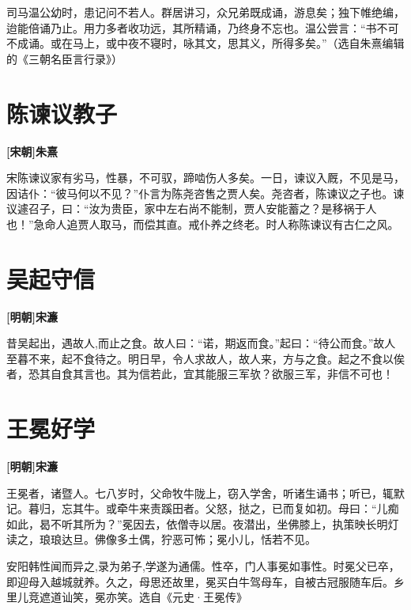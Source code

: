 \documentclass[UTF8,titlepage,oneside]{ctexbook}
\begin{document}
司马温公幼时，患记问不若人。群居讲习，众兄弟既成诵，游息矣；独下帷绝编，迨能倍诵乃止。用力多者收功远，其所精诵，乃终身不忘也。温公尝言：“书不可不成诵。或在马上，或中夜不寝时，咏其文，思其义，所得多矣。”（选自朱熹编辑的《三朝名臣言行录》）

\chapter*{陈谏议教子}
\begin{center}
	\textbf{[宋朝]朱熹}
\end{center}


宋陈谏议家有劣马，性暴，不可驭，蹄啮伤人多矣。一日，谏议入厩，不见是马，因诘仆：“彼马何以不见？”仆言为陈尧咨售之贾人矣。尧咨者，陈谏议之子也。谏议遽召子，曰：“汝为贵臣，家中左右尚不能制，贾人安能蓄之？是移祸于人也！”急命人追贾人取马，而偿其直。戒仆养之终老。时人称陈谏议有古仁之风。

\chapter*{吴起守信}
\begin{center}
	\textbf{[明朝]宋濂}
\end{center}


昔吴起出，遇故人,而止之食。故人曰：“诺，期返而食。”起曰：“待公而食。”故人至暮不来，起不食待之。明日早，令人求故人，故人来，方与之食。起之不食以俟者，恐其自食其言也。其为信若此，宜其能服三军欤？欲服三军，非信不可也！

\chapter*{王冕好学}
\begin{center}
	\textbf{[明朝]宋濂}
\end{center}


王冕者，诸暨人。七八岁时，父命牧牛陇上，窃入学舍，听诸生诵书；听已，辄默记。暮归，忘其牛。或牵牛来责蹊田者。父怒，挞之，已而复如初。母曰：“儿痴如此，曷不听其所为？”冕因去，依僧寺以居。夜潜出，坐佛膝上，执策映长明灯读之，琅琅达旦。佛像多土偶，狞恶可怖；冕小儿，恬若不见。


安阳韩性闻而异之,录为弟子,学遂为通儒。性卒，门人事冕如事性。时冕父已卒，即迎母入越城就养。久之，母思还故里，冕买白牛驾母车，自被古冠服随车后。乡里儿竞遮道讪笑，冕亦笑。选自《元史·王冕传》
\end{document}
